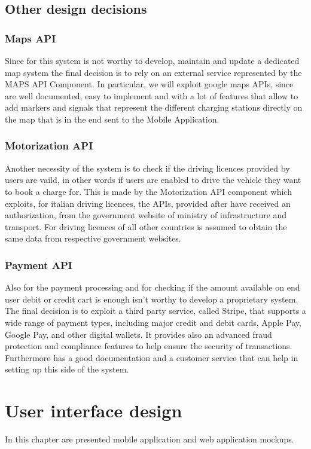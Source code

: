 \documentclass[a4paper]{report}
\begin{document}
\section{Other design decisions}

\subsection{Maps API}
Since for this system is not worthy to develop, maintain and update a dedicated map system the final decision is to rely on an external service represented by the MAPS API Component. In particular, we will exploit google maps APIs, since are well documented, easy to implement and with a lot of features that allow to add markers and signals that represent the different charging stations directly on the map that is in the end sent to the Mobile Application.

\subsection{Motorization API}
Another necessity of the system is to check if the driving licences provided by users are vaild, in other words if users are enabled to drive the vehicle they want to book a charge for. This is made by the Motorization API component which exploits, for italian driving licences, the APIs, provided after have received an authorization, from the government website of ministry of infrastructure and transport. For driving licences of all other countries is assumed to obtain the same data from respective government websites.

\subsection{Payment API}
Also for the payment processing and for checking if the amount available on end user debit or credit cart is enough isn't worthy to develop a proprietary system. The final decision is to exploit a third party service, called Stripe, that supports a wide range of payment types, including major credit and debit cards, Apple Pay, Google Pay, and other digital wallets. It provides also an advanced fraud protection and compliance features to help ensure the security of transactions. Furthermore has a good documentation and a customer service that can help in setting up this side of the system.

\chapter{User interface design}
In this chapter are presented mobile application and web application mockups.
\end{document}
